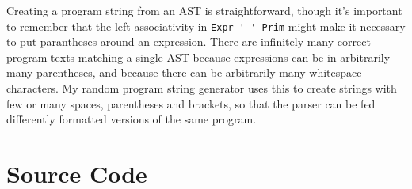 \documentclass[10pt,a4paper]{article}
\begin{document}
Creating a program string from an AST is straightforward, though it's important
to remember that the left associativity in \verb+Expr '-' Prim+ might make it
necessary to put parantheses around an expression.  There are infinitely many
correct program texts matching a single AST because expressions can be in
arbitrarily many parentheses, and because there can be arbitrarily many
whitespace characters.  My random program string generator uses this to create
strings with few or many spaces, parentheses and brackets, so that the parser
can be fed differently formatted versions of the same program.


\newpage
\appendix
\section{Source Code}


\end{document}
